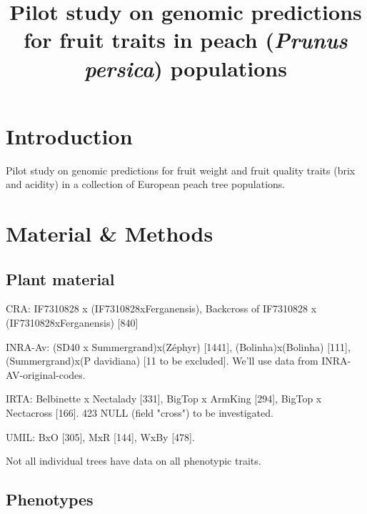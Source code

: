 \documentclass[english,11pt,a4paper]{scrartcl}
\begin{document}
\title{Pilot study on genomic predictions for fruit traits in peach 
(\emph{Prunus persica}) populations}

\date{}
\maketitle

\section*{Introduction}

Pilot study on genomic predictions for fruit weight and fruit quality traits (brix and acidity) in a collection of European peach tree populations.

\section*{Material \& Methods}

\subsection*{Plant material}

CRA: IF7310828 x (IF7310828xFerganensis), Backcross of IF7310828 x (IF7310828xFerganensis)  [840]

INRA-Av: (SD40 x Summergrand)x(Zéphyr) [1441], (Bolinha)x(Bolinha) [111], (Summergrand)x(P davidiana) [11 to be excluded]. We'll use data from INRA-AV-original-codes.

IRTA: Belbinette x Nectalady [331], BigTop x ArmKing [294], BigTop x Nectacross [166]. 423 NULL (field "cross") to be investigated.

UMIL: BxO [305], MxR [144], WxBy [478].

Not all individual trees have data on all phenotypic traits.


\subsection*{Phenotypes}
\end{document}
